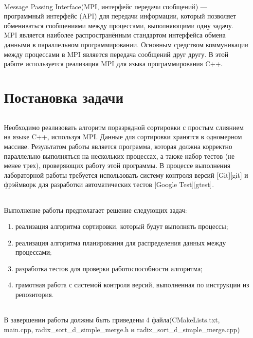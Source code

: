 \documentclass[12pt,a4paper]{article}
\begin{document}
\paragraph{}Message Passing Interface(MPI, интерфейс передачи сообщений) — программный интерфейс (API) для передачи информации, который позволяет обмениваться сообщениями между процессами, выполняющими одну задачу. MPI является наиболее распространённым стандартом интерфейса обмена данными в параллельном программировании. Основным средством коммуникации между процессами в MPI является передача сообщений друг другу. В этой работе используется реализация MPI для языка программирования C++.

\part*{Постановка задачи}
\paragraph{}Необходимо реализовать алгоритм поразрядной сортировки с простым слиянием на языке C++, используя MPI. Данные для сортировки хранятся в одномерном массиве. Результатом работы является программа, которая должна корректно параллельно выполняться на нескольких процессах, а также набор тестов (не менее трех), проверяющих работу этой программы. В процессе выполнения лабораторной работы требуется использовать систему контроля версий [Git][git] и фрэймворк для разработки автоматических тестов [Google Test][gtest].
\paragraph{}Выполнение работы предполагает решение следующих задач:
\begin{enumerate}
\item реализация алгоритма сортировки, который будут выполнять процессы;
\item реализация алгоритма планирования для распределения данных между процессами;
\item разработка тестов для проверки работоспособности алгоритма;
\item грамотная работа с системой контроля версий, выполненная по инструкции из репозитория.
\end{enumerate}
\paragraph{}В завершении работы должны быть приведены 4 файла(CMakeLists.txt, main.cpp, radix\_sort\_d\_simple\_merge.h и radix\_sort\_d\_simple\_merge.cpp)
\end{document}
